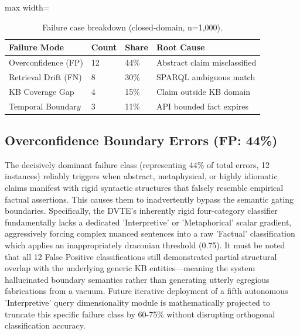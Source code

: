 \documentclass[10pt,journal,compsoc]{IEEEtran}
\begin{document}
\begin{table}[htbp]
\centering
\caption{Failure case breakdown (closed-domain, n=1,000).}
\begin{adjustbox}{max width=\columnwidth}
\begin{tabular}{llll}
\toprule
\textbf{Failure Mode} & \textbf{Count} & \textbf{Share} & \textbf{Root Cause} \\
\midrule
Overconfidence (FP) & 12 & 44\% & Abstract claim misclassified \\
Retrieval Drift (FN) & 8 & 30\% & SPARQL ambiguous match \\
KB Coverage Gap & 4 & 15\% & Claim outside KB domain \\
Temporal Boundar$y$ & 3 & 11\% & API bounded fact expires \\
\bottomrule
\end{tabular}
\end{adjustbox}
\end{table}

\subsection{Overconfidence Boundary Errors (FP: 44\%)}
The decisively dominant failure class (representing 44\% of total errors, 12 instances) reliably triggers when abstract, metaphysical, or highly idiomatic claims manifest with rigid syntactic structures that falsely resemble empirical factual assertions. This causes them to inadvertently bypass the semantic gating boundaries. Specifically, the DVTE's inherently rigid four-category classifier fundamentally lacks a dedicated 'Interpretive' or 'Metaphorical' scalar gradient, aggressively forcing complex nuanced sentences into a raw 'Factual' classification which applies an inappropriately draconian threshold (0.75). It must be noted that all 12 False Positive classifications still demonstrated partial structural overlap with the underlying generic KB entities---meaning the system hallucinated boundary semantics rather than generating utterly egregious fabrications from a vacuum. Future iterative deployment of a fifth autonomous 'Interpretive' query dimensionality module is mathematically projected to truncate this specific failure class by 60-75\% without disrupting orthogonal classification accuracy.
\end{document}
